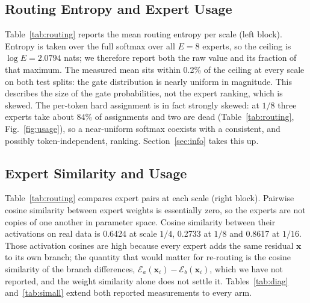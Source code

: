 \documentclass[10pt,a4paper,twocolumn,twoside]{article}
\newcommand{\bx}{\mathbf{x}}
\newcommand{\E}{\mathcal{E}}
\begin{document}
\subsection{Routing Entropy and Expert Usage}
Table~\ref{tab:routing} reports the mean routing entropy per scale (left block).
Entropy is taken over the full softmax over all $E{=}8$ experts, so the ceiling is
$\log E = 2.0794$ nats; we therefore report both the raw value and its fraction of that
maximum.
The measured mean sits within 0.2\% of the ceiling at every scale on both test
splits: the gate distribution is nearly uniform in magnitude. This describes the size
of the gate probabilities, not the expert ranking, which is skewed. The per-token hard
assignment is in fact strongly skewed: at $1/8$ three
experts take about $84\%$ of assignments and two are dead (Table~\ref{tab:routing}, Fig.~\ref{fig:usage}), so a
near-uniform softmax coexists with a consistent, and possibly token-independent, ranking.
Section~\ref{sec:info} takes this up.


\subsection{Expert Similarity and Usage}
Table~\ref{tab:routing} compares expert pairs at each scale (right block).
Pairwise cosine similarity between expert weights is essentially zero, so the experts
are not copies of one another in parameter space. Cosine similarity between their
activations on real data is 0.6424 at scale $1/4$, 0.2733 at $1/8$ and 0.8617 at
$1/16$. Those activation cosines are high because every expert adds the same residual
$\bx$ to its own branch; the quantity that would matter for re-routing is the cosine similarity
of the branch differences, $\E_a(\bx_i) - \E_b(\bx_i)$, which we have not reported, and
the weight similarity alone does not settle it. Tables~\ref{tab:diag}
and~\ref{tab:simall} extend both reported measurements to every arm.
\end{document}
